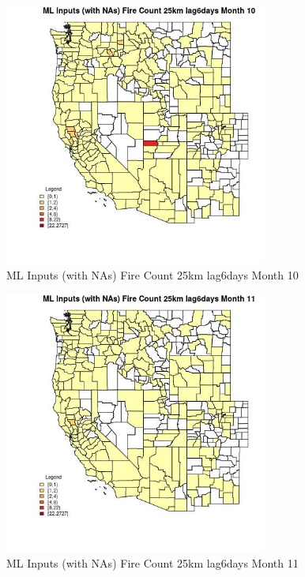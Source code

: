 \begin{figure} 
\centering  
\includegraphics[width=0.77\textwidth]{Code_Outputs/Report_ML_input_PM25_Step4_part_f_de_duplicated_aveswNAs_CountyFire_Count_25km_lag6daysmedianMonth10.jpg} 
\caption{\label{fig:Report_ML_input_PM25_Step4_part_f_de_duplicated_aveswNAsCountyFire_Count_25km_lag6daysmedianMonth10}ML Inputs (with NAs) Fire Count 25km lag6days Month 10} 
\end{figure} 
 

\begin{figure} 
\centering  
\includegraphics[width=0.77\textwidth]{Code_Outputs/Report_ML_input_PM25_Step4_part_f_de_duplicated_aveswNAs_CountyFire_Count_25km_lag6daysmedianMonth11.jpg} 
\caption{\label{fig:Report_ML_input_PM25_Step4_part_f_de_duplicated_aveswNAsCountyFire_Count_25km_lag6daysmedianMonth11}ML Inputs (with NAs) Fire Count 25km lag6days Month 11} 
\end{figure} 
 

